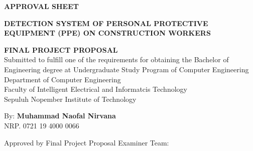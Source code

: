\begin{center}
  \large
  \textbf{APPROVAL SHEET}
\end{center}

\thispagestyle{empty}

\begin{center}
  \textbf{DETECTION SYSTEM OF PERSONAL PROTECTIVE EQUIPMENT (PPE) ON CONSTRUCTION WORKERS}
\end{center}

\begingroup
\small

\begin{center}
  \textbf{FINAL PROJECT PROPOSAL} \\
  Submitted to fulfill one of the requirements for obtaining the Bachelor of Engineering degree
  at Undergraduate Study Program of Computer Engineering \\
  Department of Computer Engineering \\
  Faculty of Intelligent Electrical and Informatcis Technology \\
  Sepuluh Nopember Institute of Technology
\end{center}

\begin{center}
  By: \textbf{Muhammad Naofal Nirvana} \\
  NRP. 0721 19 4000 0066
\end{center}

\begin{center}
  Approved by Final Project Proposal Examiner Team:
\end{center}

\begingroup
\setlength{\tabcolsep}{0pt}

